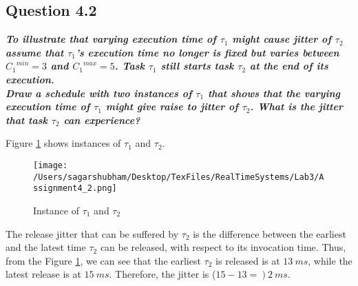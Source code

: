 \documentclass[oneside,a4paper]{article}
\begin{document}
\subsection*{\normalsize{Question 4.2}}
\textit{\textbf{To illustrate that varying execution time of $\tau_1$ might cause jitter of $\tau_2$ assume that $\tau_1$’s execution time no longer is fixed but varies between ${C_1}^{min} = 3$ and ${C_1}^{max} = 5$. Task $\tau_1$ still starts task $\tau_2$ at the end of its execution. \\
Draw a schedule with two instances of $\tau_1$ that shows that the varying execution time of $\tau_1$ might
give raise to jitter of $\tau_2$. What is the jitter that task $\tau_2$ can experience?}}\par
Figure \ref{fig4_2} shows instances of $\tau_1$ and $\tau_2$.
\begin{center}
\begin{figure}[H]
                    \centering
                    \texttt{[image: /Users/sagarshubham/Desktop/TexFiles/RealTimeSystems/Lab3/Assignment4\_2.png]}
                    \caption[Figure for Question 4.2]{Instance of $\tau_1$ and $\tau_2$}
                    \label{fig4_2}        
\end{figure}
\end{center}\par
The release jitter that can be suffered by $\tau_2$ is the difference between the earliest and the latest time $\tau_2$ can be released, with respect to its invocation time. Thus, from the Figure \ref{fig4_2}, we can see that the earliest $\tau_2$ is released is at $13\ ms$, while the latest release is at $15\ ms$. Therefore, the jitter is ($15 - 13 =\ )\ 2\ ms$. \par
\pagebreak
\end{document}

